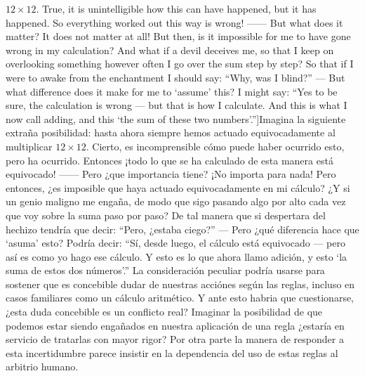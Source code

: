 $12\times12$. True, it is unintelligible how this can have happened, but it has happened. So everything worked out this way is wrong! ------ But what does it matter? It does not matter at all! \textelp{} But then, is it impossible for me to have gone wrong in my calculation? And what if a devil deceives me, so that I keep on overlooking something however often I go over the sum step by step? So that if I were to awake from the enchantment I should say: ``Why, was I blind?'' --- But what difference does it make for me to `assume' this? I might say: ``Yes to be sure, the calculation is wrong --- but that is how I calculate. And this is what I now call adding, and this `the sum of these two numbers'.'']{Imagina la siguiente extraña posibilidad: hasta ahora siempre hemos actuado equivocadamente al multiplicar $12\times12$. Cierto, es incomprensible cómo puede haber ocurrido esto, pero ha ocurrido. Entonces ¡todo lo que se ha calculado de esta manera está equivocado! ------ Pero ¿que importancia tiene? ¡No importa para nada! \textelp{} Pero entonces, ¿es imposible que haya actuado equivocadamente en mi cálculo? ¿Y si un genio maligno me engaña, de modo que sigo pasando algo por alto cada vez que voy sobre la suma paso por paso? De tal manera que si despertara del hechizo tendría que decir: ``Pero, ¿estaba ciego?'' --- Pero ¿qué diferencia hace que `asuma' esto? Podría decir: ``Sí, desde luego, el cálculo está equivocado --- pero así es como yo hago ese cálculo. Y esto es lo que ahora llamo adición, y esto `la suma de estos dos números'.''} La consideración peculiar podría usarse para sostener que es concebible dudar de nuestras acciónes según las reglas, incluso en casos familiares como un cálculo aritmético. Y ante esto habria que cuestionarse, ¿esta duda concebible es un conflicto real? Imaginar la posibilidad de que podemos estar siendo engañados en nuestra aplicación de una regla ¿estaría en servicio de tratarlas con mayor rigor? Por otra parte la manera de responder a esta incertidumbre parece insistir en la dependencia del uso de estas reglas al arbitrio humano.

